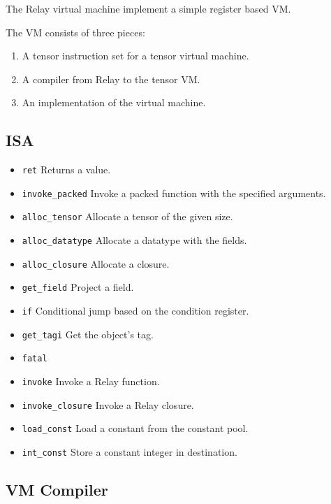 The Relay virtual machine implement a simple register based VM.

The VM consists of three pieces:
\begin{enumerate}
  \item A tensor instruction set for a tensor virtual machine.
  \item A compiler from Relay to the tensor VM.
  \item An implementation of the virtual machine.
\end{enumerate}

\subsection{ISA}
\begin{itemize}
    \item \verb|ret| Returns a value.
    \item \verb|invoke_packed| Invoke a packed function with the specified arguments.
    \item \verb|alloc_tensor| Allocate a tensor of the given size.
    \item \verb|alloc_datatype| Allocate a datatype with the fields.
    \item \verb|alloc_closure| Allocate a closure.
    \item \verb|get_field| Project a field.
    \item \verb|if| Conditional jump based on the condition register.
    \item \verb|get_tagi| Get the object's tag.
    \item \verb|fatal|
    \item \verb|invoke| Invoke a Relay function.
    \item \verb|invoke_closure| Invoke a Relay closure.
    \item \verb|load_const| Load a constant from the constant pool.
    \item \verb|int_const| Store a constant integer in destination.

\end{itemize}
\subsection{VM Compiler}

